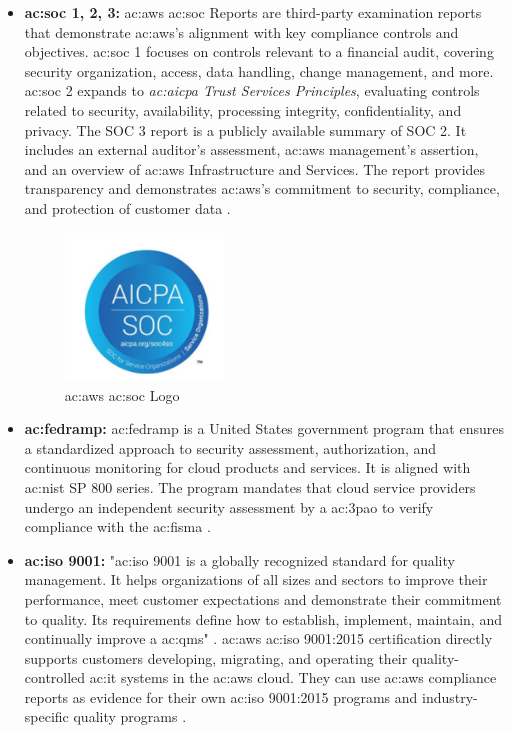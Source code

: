 \begin{itemize}
    \item \textbf{\gls{ac:soc} 1, 2, 3: } \gls{ac:aws} \gls{ac:soc} Reports are third-party examination reports that demonstrate \gls{ac:aws}'s alignment with key compliance controls and objectives. \gls{ac:soc} 1 focuses on controls relevant to a financial audit, covering security organization, access, data handling, change management, and more. \gls{ac:soc} 2 expands to \textit{\gls{ac:aicpa} Trust Services Principles}, evaluating controls related to security, availability, processing integrity, confidentiality, and privacy. The SOC 3 report is a publicly available summary of SOC 2. It includes an external auditor's assessment, \gls{ac:aws} management's assertion, and an overview of \gls{ac:aws} Infrastructure and Services. The report provides transparency and demonstrates \gls{ac:aws}'s commitment to security, compliance, and protection of customer data \cite{AWSSOC3}.
    \begin{figure}[h]  %
        \centering
        \includegraphics[width=0.4\textwidth]{images/AWSSOC.png}  %
        \caption{\gls{ac:aws} \gls{ac:soc} Logo}
        \label{fig:AWSSOC}
    \end{figure}
    \item \textbf{\gls{ac:fedramp}:} \gls{ac:fedramp} is a United States government program that ensures a standardized approach to security assessment, authorization, and continuous monitoring for cloud products and services. It is aligned with \gls{ac:nist} SP 800 series. The program mandates that cloud service providers undergo an independent security assessment by a \gls{ac:3pao} to verify compliance with the  \gls{ac:fisma} \cite{Fedramp}.
    \item \textbf{\gls{ac:iso} 9001:} "\gls{ac:iso} 9001 is a globally recognized standard for quality management. It helps organizations of all sizes and sectors to improve their performance, meet customer expectations and demonstrate their commitment to quality. Its requirements define how to establish, implement, maintain, and continually improve a \gls{ac:qms}" \cite{ISO9001}. \gls{ac:aws} \gls{ac:iso} 9001:2015 certification directly supports customers developing, migrating, and operating their quality-controlled \gls{ac:it} systems in the \gls{ac:aws} cloud. They can use \gls{ac:aws} compliance reports as evidence for their own \gls{ac:iso} 9001:2015 programs and industry-specific quality programs \cite{AWSISO9001}.

\end{itemize}
